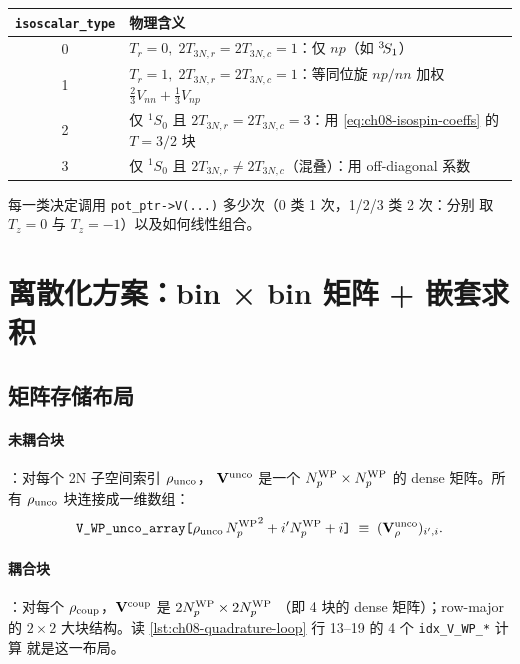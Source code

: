\begin{center}
\begin{tabular}{cp{8.5cm}}
\toprule
\texttt{isoscalar\_type} & 物理含义 \\
\midrule
0 & \(T_r = 0,\;2T_{3N,r} = 2T_{3N,c} = 1\)：仅 \(np\)（如 \({}^{3}\!S_{1}\)） \\
1 & \(T_r = 1,\;2T_{3N,r} = 2T_{3N,c} = 1\)：等同位旋 \(np/nn\) 加权 \(\tfrac{2}{3} V_{nn} + \tfrac{1}{3} V_{np}\) \\
2 & 仅 \({}^1S_0\) 且 \(2T_{3N,r}\!=\!2T_{3N,c}\!=\!3\)：用 \cref{eq:ch08-isospin-coeffs} 的 \(T = 3/2\) 块 \\
3 & 仅 \({}^1S_0\) 且 \(2T_{3N,r}\!\neq\!2T_{3N,c}\)（混叠）：用 off-diagonal 系数 \\
\bottomrule
\end{tabular}
\end{center}

每一类决定调用 \texttt{pot\_ptr->V(...)} 多少次（0 类 1 次，1/2/3 类 2 次：分别
取 \(T_z = 0\) 与 \(T_z = -1\)）以及如何线性组合。

\section{离散化方案：bin × bin 矩阵 + 嵌套求积}
\label{sec:ch08-discretization}

\subsection{矩阵存储布局}
\label{subsec:ch08-storage}

\paragraph{未耦合块}：对每个 2N 子空间索引 \(\rho_{\rm unco}\)，
\(\mathbf{V}^{\text{unco}}\) 是一个 \({N_{p}^{\text{WP}}} \times {N_{p}^{\text{WP}}}\) 的 dense 矩阵。所有 \(\rho_{\rm unco}\)
块连接成一维数组：
\begin{equation}
\texttt{V\_WP\_unco\_array[}\rho_{\rm unco}\,{N_{p}^{\text{WP}}}^2 + i' {N_{p}^{\text{WP}}} + i\texttt{]}
\;\equiv\; (\mathbf{V}^{\text{unco}}_\rho)_{i', i}.
\end{equation}

\paragraph{耦合块}：对每个 \(\rho_{\rm coup}\)，\(\mathbf{V}^{\text{coup}}\) 是 \(2{N_{p}^{\text{WP}}} \times 2{N_{p}^{\text{WP}}}\)
（即 4 块的 dense 矩阵）；row-major 的 \(2 \times 2\) 大块结构。读
\cref{lst:ch08-quadrature-loop} 行 13--19 的 4 个 \texttt{idx\_V\_WP\_*} 计算
就是这一布局。

